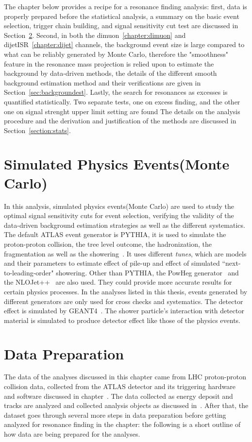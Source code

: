 The chapter below provides a recipe for a resonance finding analysis: first, data is properly prepared before the statistical analysis, a summary on the basic event selection, trigger chain building, and signal sensitivity cut test are discussed in Section~\ref{sec:dataprep}. Second, in both the dimuon~\ref{chapter:dimuon} and dijetISR~\ref{chapter:dijet} channels, the background event size is large compared to what can be reliably generated by Monte Carlo, therefore the "smoothness"
feature in the resonance mass projection is relied upon to estimate the background by data-driven methods, the details of the different smooth background estimation method and their verifications are given in Section~\ref{sec:backgroundest}. Lastly, the search for resonances as excesses is quantified statistically. Two separate tests, one on excess finding, and the other one on signal strenght upper limit setting are found The details on the analysis procedure and the derivation
and justification of the methods are discussed in Section~\ref{section:stats}. 

\section{Simulated Physics Events(Monte Carlo)}
In this analysis, simulated physics events(Monte Carlo) are used to study the optimal signal sensitivity cuts for event selection, verifying the validity of the data-driven background estimation strategies as well as the different systematics.
The default ATLAS event generator is PYTHIA, it is used to simulate the proton-proton collision, the tree level outcome, the hadronization, the fragmentation as well as the showering~\cite{PYTHIA}. It uses different \textit{tunes}, which are models and their parameters to estimate effect of pile-up and effect of simulated ``next-to-leading-order" showering. Other than PYTHIA, the PowHeg generator~\cite{oleari2010powheg} and the NLOJet++~\cite{nagynlojet++} are also used. They could provide more accurate results for certain physics processes. In the analyses listed in this thesis, events generated by different generators are only used for cross checks and systematics. 
The detector effect is simulated by GEANT4~\cite{Agostinelli:602040}. The shower particle's interaction with detector material is simulated to produce detector effect like those of the physics events.



\section{Data Preparation}
\label{sec:dataprep}
The data of the analyses discussed in this chapter came from LHC proton-proton collision data, collected from the ATLAS detector and its triggering hardware and software discussed in chapter~\cite{chapter:ATLAS}. The data collected as energy deposit and tracks are analyzed and collected analysis objects as discussed in~\cite{chapter:common_analysis_objects}. After that, the dataset goes through several more steps in data preparation before getting analyzed for resonance finding in the chapter: the following is a short outline of how data are being prepared for the analyses.

